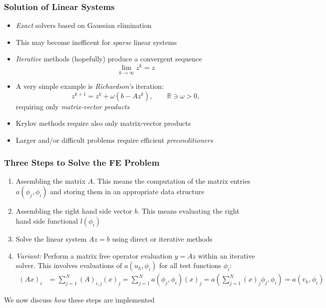 \documentclass[aspectratio=169,11pt]{beamer}
\theoremstyle{definition}
\begin{document}
\begin{frame}
\frametitle{Solution of Linear Systems}
\begin{itemize}
\item {\em Exact} solvers based on Gaussian elimination
\item This may become inefficent for {\em sparse} linear systems
\item {\em Iterative} methods (hopefully) produce a convergent sequence
$$\lim_{k\to\infty} z^k = z$$
\item A very simple example is {\em Richardson's} iteration:
$$ z^{k+1} = z^{k} + \omega (b-Az^{k}), \qquad \mathbb{R}\ni \omega > 0,$$
requiring only {\em matrix-vector products}
\item Krylov methods require also only matrix-vector products
\item Larger and/or difficult problems require efficient \textit{preconditioners}
\end{itemize}
\end{frame}

\begin{frame}
\frametitle{Three Steps to Solve the FE Problem}
\begin{enumerate}
\item Assembling the matrix $A$. This means the computation of the matrix
entries $a(\phi_j,\phi_i)$ and storing them in an appropriate data structure
\item Assembling the right hand side vector $b$. This means evaluating
the right hand side functional $l(\phi_i)$
\item Solve the linear system $Az=b$ using direct or iterative methods
\item {\em Variant:} Perform a matrix free operator evaluation $y=Az$ within an iterative solver. This involves evaluations
of $a(u_h,\phi_i)$ for all test functions $\phi_i$:
\begin{align*}
(Ax)_i &= \sum_{j=1}^N (A)_{i,j} (x)_j = \sum_{j=1}^N a(\phi_j,\phi_i) (x)_j = a\left(\sum_{j=1}^N (x)_j\phi_j,\phi_i\right) = a(v_h,\phi_i)
\end{align*}
\end{enumerate}
We now discuss {\em how} these steps are implemented
\end{frame}
\end{document}
